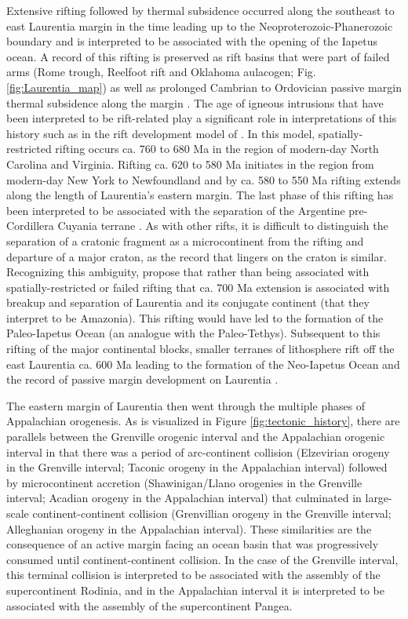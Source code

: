 \documentclass[11pt,letterpaper]{article}
\begin{document}
Extensive rifting followed by thermal subsidence occurred along the southeast to east Laurentia margin in the time leading up to the Neoproterozoic-Phanerozoic boundary and is interpreted to be associated with the opening of the Iapetus ocean. A record of this rifting is preserved as rift basins that were part of failed arms (Rome trough, Reelfoot rift and Oklahoma aulacogen; Fig. \ref{fig:Laurentia_map}) as well as prolonged Cambrian to Ordovician passive margin thermal subsidence along the margin \citep{Bond1984a, Whitmeyer2007a}. The age of igneous intrusions that have been interpreted to be rift-related play a significant role in interpretations of this history such as in the rift development model of \citet{Burton2010a}. In this model, spatially-restricted rifting occurs ca. 760 to 680 Ma in the region of modern-day North Carolina and Virginia. Rifting ca. 620 to 580 Ma initiates in the region from modern-day New York to Newfoundland and by ca. 580 to 550 Ma rifting extends along the length of Laurentia's eastern margin. The last phase of this rifting has been interpreted to be associated with the separation of the Argentine pre-Cordillera Cuyania terrane \citep{Dickerson1998a}. As with other rifts, it is difficult to distinguish the separation of a cratonic fragment as a microcontinent from the rifting and departure of a major craton, as the record that lingers on the craton is similar. Recognizing this ambiguity, \citet{Robert2020a} propose that rather than being associated with spatially-restricted or failed rifting that ca. 700 Ma extension is associated with breakup and separation of Laurentia and its conjugate continent (that they interpret to be Amazonia). This rifting would have led to the formation of the Paleo-Iapetus Ocean (an analogue with the Paleo-Tethys). Subsequent to this rifting of the major continental blocks, smaller terranes of lithosphere rift off the east Laurentia ca. 600 Ma leading to the formation of the Neo-Iapetus Ocean and the record of passive margin development on Laurentia \citep{Robert2020a}.

The eastern margin of Laurentia then went through the multiple phases of Appalachian orogenesis. As is visualized in Figure \ref{fig:tectonic_history}, there are parallels between the Grenville orogenic interval and the Appalachian orogenic interval in that there was a period of arc-continent collision (Elzevirian orogeny in the Grenville interval; Taconic orogeny in the Appalachian interval) followed by microcontinent accretion (Shawinigan/Llano orogenies in the Grenville interval; Acadian orogeny in the Appalachian interval) that culminated in large-scale continent-continent collision (Grenvillian orogeny in the Grenville interval; Alleghanian orogeny in the Appalachian interval). These similarities are the consequence of an active margin facing an ocean basin that was progressively consumed until continent-continent collision. In the case of the Grenville interval, this terminal collision is interpreted to be associated with the assembly of the supercontinent Rodinia, and in the Appalachian interval it is interpreted to be associated with the assembly of the supercontinent Pangea.
\end{document}
